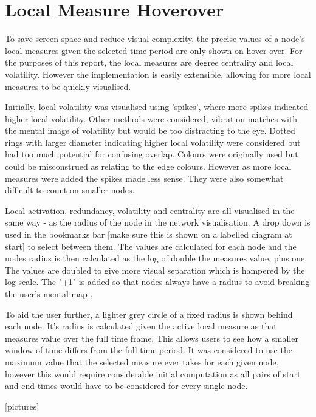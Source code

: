 \section{Local Measure Hoverover}
To save screen space and reduce visual complexity, the precise values of a node's local measures given the selected time period are only shown on hover over. For the purposes of this report, the local measures are degree centrality and local volatility. However the implementation is easily extensible, allowing for more local measures to be quickly visualised.

Initially, local volatility was visualised using 'spikes', where more spikes indicated higher local volatility. Other methods were considered, vibration matches with the mental image of volatility but would be too distracting to the eye. Dotted rings with larger diameter indicating higher local volatility were considered but had too much potential for confusing overlap. Colours were originally used but could be misconstrued as relating to the edge colours. 
However as more local measures were added the spikes made less sense. They were also somewhat difficult to count on smaller nodes.

Local activation, redundancy, volatility and centrality are all visualised in the same way - as the radius of the node in the network visualisation. A drop down is used in the bookmarks bar [make sure this is shown on a labelled diagram at start] to select between them. The values are calculated for each node and the nodes radius is then calculated as the log of double the measures value, plus one. The values are doubled to give more visual separation which is hampered by the log scale. The "+1" is added so that nodes always have a radius to avoid breaking the user's mental map \cite{BLANK}.

To aid the user further, a lighter grey circle of a fixed radius is shown behind each node. It's radius is calculated given the active local measure as that measures value over the full time frame. This allows users to see how a smaller window of time differs from the full time period. It was considered to use the maximum value that the selected measure ever takes for each given node, however this would require considerable initial computation as all pairs of start and end times would have to be considered for every single node.

[pictures]
